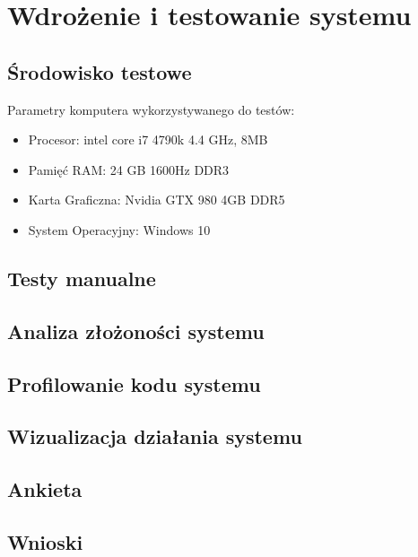  \newpage\section{Wdrożenie i testowanie systemu \NazwaSys} \label{sec:testy}
\subsection{Środowisko testowe}
Parametry komputera wykorzystywanego do testów:
\begin{itemize}
    \item Procesor: intel core i7 4790k 4.4 GHz, 8MB
    \item Pamięć RAM: 24 GB  1600Hz DDR3
    \item Karta Graficzna: Nvidia GTX 980 4GB DDR5
    \item System Operacyjny: Windows 10
\end{itemize}
\subsection{Testy manualne}
\subsection{Analiza złożoności systemu \NazwaSys}
\subsection{Profilowanie kodu systemu \NazwaSys}
\subsection{Wizualizacja działania systemu \NazwaSys}
\subsection{Ankieta}
\subsection{Wnioski}
 
